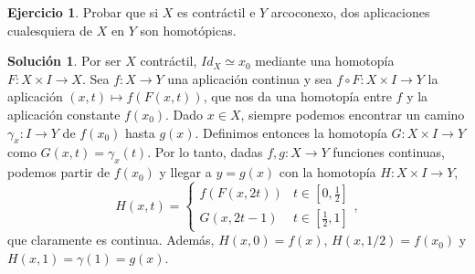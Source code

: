 \documentclass{article}
\theoremstyle{plain}
\theoremstyle{definition}
\newtheorem{exercise}{Ejercicio}
\newtheorem*{sol*}{Solución}
\begin{document}
\newpage
\begin{exercise}
Probar que si $X$ es contráctil e $Y$ arcoconexo, dos aplicaciones cualesquiera de $X$ en $Y$ son homotópicas.
\end{exercise}
\begin{sol*}
Por ser $X$ contráctil, $Id_X\simeq x_0$ mediante una homotopía $F:X\times I\to X$. Sea $f:X\to Y$ una aplicación continua y sea $f\circ F: X\times I\to Y$ la aplicación $(x,t)\mapsto f(F(x,t))$, que nos da una homotopía entre $f$ y la aplicación constante $f(x_0)$. Dado $x\in X$, siempre podemos encontrar un camino $\gamma_x: I\to Y$ de $f(x_0)$ hasta $g(x)$. Definimos entonces la homotopía $G:X\times I\to Y$ como $G(x,t)=\gamma_x(t)$. Por lo tanto, dadas $f,g:X\to Y$ funciones continuas, podemos partir de $f(x_0)$ y llegar a $y=g(x)$ con la homotopía $H:X\times I \to Y$,
$$
H(x,t)=\begin{cases}
f(F(x,2t)) & t\in[0,\frac{1}{2}]\\
G(x,2t-1) & t\in[\frac{1}{2},1]
\end{cases},
$$
que claramente es continua. Además, $H(x,0) = f(x)$, $H(x,1/2)=f(x_0)$ y $H(x,1)=\gamma(1)= g(x)$.
\end{sol*}
\end{document}
